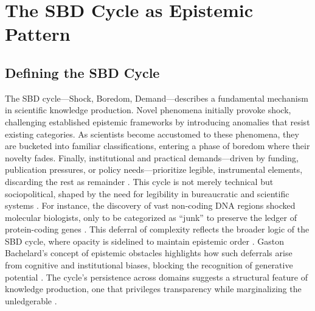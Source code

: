 \documentclass[11pt]{article}
\begin{document}
\section{The SBD Cycle as Epistemic Pattern}

\subsection{Defining the SBD Cycle}
The SBD cycle---Shock, Boredom, Demand---describes a fundamental mechanism in scientific knowledge production. Novel phenomena initially provoke shock, challenging established epistemic frameworks by introducing anomalies that resist existing categories. As scientists become accustomed to these phenomena, they are bucketed into familiar classifications, entering a phase of boredom where their novelty fades. Finally, institutional and practical demands---driven by funding, publication pressures, or policy needs---prioritize legible, instrumental elements, discarding the rest as remainder \citep{latour1987, scott1998}. This cycle is not merely technical but sociopolitical, shaped by the need for legibility in bureaucratic and scientific systems \citep{jasanoff2004}. For instance, the discovery of vast non-coding DNA regions shocked molecular biologists, only to be categorized as ``junk'' to preserve the ledger of protein-coding genes \citep{ohno1972}. This deferral of complexity reflects the broader logic of the SBD cycle, where opacity is sidelined to maintain epistemic order \citep{bowker2005}. Gaston Bachelard’s concept of epistemic obstacles highlights how such deferrals arise from cognitive and institutional biases, blocking the recognition of generative potential \citep{bachelard1984}. The cycle’s persistence across domains suggests a structural feature of knowledge production, one that privileges transparency while marginalizing the unledgerable \citep{star1989}.
\end{document}
